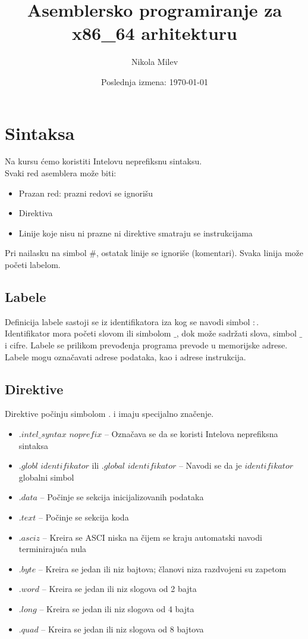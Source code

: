 \documentclass[a4paper, 10pt]{article}
\begin{document}
\title{Asemblersko programiranje za x86\_64 arhitekturu}
\author{Nikola Milev}
\date{Poslednja izmena: \today}
\maketitle

\section[1]{Sintaksa}
	Na kursu ćemo koristiti Intelovu neprefiksnu sintaksu. \\ 
	Svaki red asemblera može biti:
	\begin{itemize}
		\item Prazan red: prazni redovi se ignorišu
		\item Direktiva
		\item Linije koje nisu ni prazne ni direktive smatraju se instrukcijama
	\end{itemize}
Pri nailasku na simbol $\#$, ostatak linije se ignoriše (komentari). Svaka linija može početi labelom.
	\subsection{Labele}
Definicija labele sastoji se iz identifikatora iza kog se navodi simbol $:$. Identifikator mora početi slovom ili simbolom $\_$, dok može sadržati slova, simbol $\_$ i cifre. Labele se prilikom prevođenja programa prevode u memorijske adrese. Labele mogu označavati adrese podataka, kao i adrese instrukcija.
	\subsection{Direktive}
	Direktive počinju simbolom $.$ i imaju specijalno značenje. 
	\begin{itemize}
		\item $.intel\_syntax$ $noprefix$ -- Označava se da se koristi Intelova neprefiksna sintaksa
		\item $.globl$ $identifikator$ ili $.global$ $identifikator$ -- Navodi se da je $identifikator$ globalni simbol
		\item $.data$ -- Počinje se sekcija inicijalizovanih podataka
		\item $.text$ -- Počinje se sekcija koda
		\item $.asciz$ -- Kreira se ASCI niska na čijem se kraju automatski navodi terminirajuća nula
		\item $.byte$ -- Kreira se jedan ili niz bajtova; članovi niza razdvojeni su zapetom
		\item $.word$ -- Kreira se jedan ili niz slogova od 2 bajta
		\item $.long$ -- Kreira se jedan ili niz slogova od 4 bajta
		\item $.quad$ -- Kreira se jedan ili niz slogova od 8 bajtova
	\end{itemize}
\end{document}
